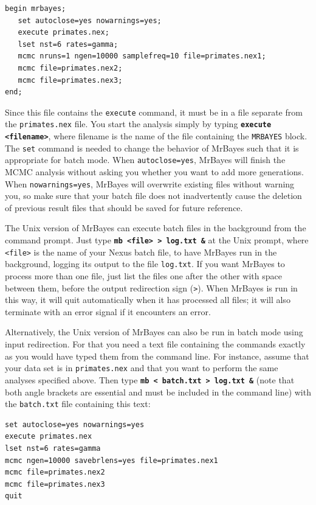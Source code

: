 \documentclass[12pt]{book}
\newcommand{\ttt}[1]{\texttt{#1}}
\newcommand{\tb}[1]{\ttt{\textbf{#1}}}
\begin{document}
\begin{singlespacing}
\footnotesize
\begin{verbatim}
begin mrbayes;
   set autoclose=yes nowarnings=yes;
   execute primates.nex;
   lset nst=6 rates=gamma;
   mcmc nruns=1 ngen=10000 samplefreq=10 file=primates.nex1;
   mcmc file=primates.nex2;
   mcmc file=primates.nex3;
end;
\end{verbatim}
\normalsize
\end{singlespacing}

Since this file contains the \ttt{execute} command, it must be in a file separate from the
\ttt{primates.nex} file. You start the analysis simply by typing \tb{execute <filename>}, where
filename is the name of the file containing the \ttt{MRBAYES} block. The \ttt{set} command is
needed to change the behavior of MrBayes such that it is appropriate for batch mode. When
\ttt{autoclose=yes}, MrBayes will finish the MCMC analysis without asking you whether you want to
add more generations. When \ttt{nowarnings=yes}, MrBayes will overwrite existing files without
warning you, so make sure that your batch file does not inadvertently cause the deletion of
previous result files that should be saved for future reference.

The Unix version of MrBayes can execute batch files in the background from the command prompt. Just
type \tb{mb <file> > log.txt \&} at the Unix prompt, where \ttt{<file>} is the name of your Nexus
batch file, to have MrBayes run in the background, logging its output to the file \ttt{log.txt}. If
you want MrBayes to process more than one file, just list the files one after the other with space
between them, before the output redirection sign (\ttt{>}). When MrBayes is run in this way, it
will quit automatically when it has processed all files; it will also terminate with an error
signal if it encounters an error.

Alternatively, the Unix version of MrBayes can also be run in batch mode using input redirection.
For that you need a text file containing the commands exactly as you would have typed them from the
command line. For instance, assume that your data set is in \ttt{primates.nex} and that you want to
perform the same analyses specified above. Then type \tb{mb < batch.txt > log.txt \&} (note that
both angle brackets are essential and must be included in the command line) with the
\ttt{batch.txt} file containing this text:

\begin{singlespacing}
\footnotesize
\begin{verbatim}
set autoclose=yes nowarnings=yes
execute primates.nex
lset nst=6 rates=gamma
mcmc ngen=10000 savebrlens=yes file=primates.nex1
mcmc file=primates.nex2
mcmc file=primates.nex3
quit
\end{verbatim}
\normalsize
\end{singlespacing}
\end{document}
